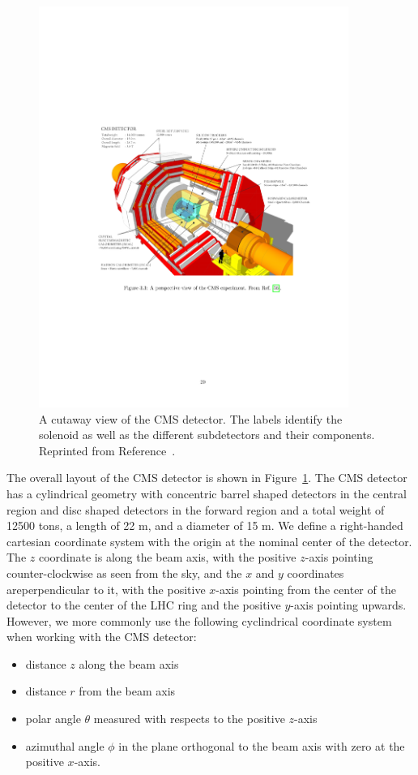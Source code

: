 \begin{figure}[htbp]
  \centering
  \includegraphics[width=0.9\textwidth]{Detector/Figures/cms_detector.pdf}
  \caption{
    A cutaway view of the CMS detector.
    The labels identify the solenoid as well as the different subdetectors and their components. 
    Reprinted from Reference~\cite{CmsWeb}. 
  }
  \label{fig:cms}
\end{figure}

The overall layout of the CMS detector is shown in Figure~\ref{fig:cms}. 
The CMS detector has a cylindrical geometry with concentric barrel shaped detectors in the central region and disc shaped detectors in the forward region and a total weight of 12500 tons, a length of 22 m, and a diameter of 15 m.
We define a right-handed cartesian coordinate system with the origin at the nominal center of the detector.
The $z$ coordinate is along the beam axis, with the positive $z$-axis pointing counter-clockwise as seen from the sky, and the $x$ and $y$ coordinates areperpendicular to it, with the positive $x$-axis pointing from the center of the detector to the center of the LHC ring and the positive $y$-axis pointing upwards.
However, we more commonly use the following cyclindrical coordinate system when working with the CMS detector:
\begin{itemize}
\item distance $z$ along the beam axis
\item distance $r$ from the beam axis
\item polar angle $\theta$ measured with respects to the positive $z$-axis
\item azimuthal angle $\phi$ in the plane orthogonal to the beam axis with zero at the positive $x$-axis.
\end{itemize}

